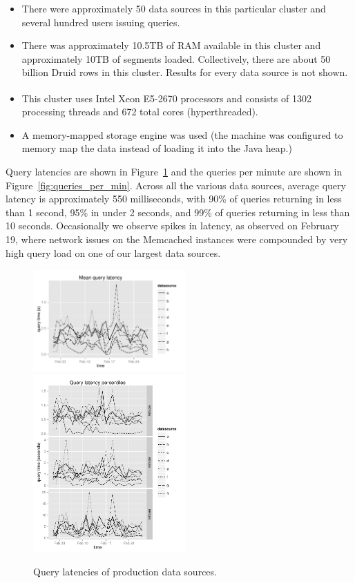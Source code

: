 \documentclass{vldb}
\begin{document}
{\begin{itemize}[leftmargin=*,beginpenalty=5000,topsep=0pt]
\item There were
approximately 50 data sources in this particular cluster and several hundred users issuing
queries.

\item There was approximately 10.5TB of RAM available in this cluster and
approximately 10TB of segments loaded. Collectively,
there are about 50 billion Druid rows in this cluster. Results for
every data source is not shown.

\item This cluster uses Intel\textsuperscript{\textregistered} Xeon\textsuperscript{\textregistered} E5-2670 processors and consists of 1302 processing
threads and 672 total cores (hyperthreaded).

\item A memory-mapped storage engine was used (the machine was configured to
    memory map the data instead of loading it into the Java heap.)
\end{itemize}

Query latencies are shown in Figure~\ref{fig:query_latency} and the queries per
minute are shown in Figure~\ref{fig:queries_per_min}. Across all the various
data sources, average query latency is approximately 550 milliseconds, with
90\% of queries returning in less than 1 second, 95\% in under 2 seconds, and
99\% of queries returning in less than 10 seconds. Occasionally we observe
spikes in latency, as observed on February 19, where network issues on
the Memcached instances were compounded by very high query load on one of our
largest data sources.

\begin{figure}
\centering
\includegraphics[width = 2.3in]{avg_query_latency}
\includegraphics[width = 2.3in]{query_percentiles}
\caption{Query latencies of production data sources.}
\label{fig:query_latency}
\end{figure}

}
\end{document}
